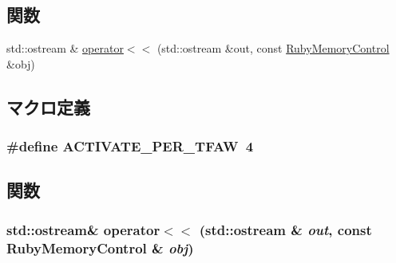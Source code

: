 \subsection*{関数}
\begin{DoxyCompactItemize}
\item 
std::ostream \& \hyperlink{RubyMemoryControl_8hh_ad26dd2b8c9fc49e3425c8a83032c8caa}{operator$<$$<$} (std::ostream \&out, const \hyperlink{classRubyMemoryControl}{RubyMemoryControl} \&obj)
\end{DoxyCompactItemize}


\subsection{マクロ定義}
\hypertarget{RubyMemoryControl_8hh_a783700b32287aaa8e56e1b63a611a927}{
\subsubsection[{ACTIVATE\_\-PER\_\-TFAW}]{\setlength{\rightskip}{0pt plus 5cm}\#define ACTIVATE\_\-PER\_\-TFAW~4}}
\label{RubyMemoryControl_8hh_a783700b32287aaa8e56e1b63a611a927}


\subsection{関数}
\hypertarget{RubyMemoryControl_8hh_ad26dd2b8c9fc49e3425c8a83032c8caa}{
\subsubsection[{operator$<$$<$}]{\setlength{\rightskip}{0pt plus 5cm}std::ostream\& operator$<$$<$ (std::ostream \& {\em out}, \/  const {\bf RubyMemoryControl} \& {\em obj})}}
\label{RubyMemoryControl_8hh_ad26dd2b8c9fc49e3425c8a83032c8caa}
